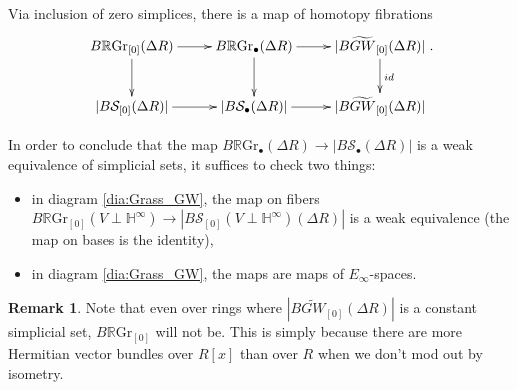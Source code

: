 \documentclass[edeposit,fullpage]{uiucthesis2009}
\newcommand{\mbb}{\mathbb}
\newcommand{\mc}{\mathcal}
\newcommand{\RGr}{\mathbb R\mathrm{Gr}}
\theoremstyle{plain}
\numberwithin{lemma}{section}
\theoremstyle{definition}
\newtheorem{remark}[lemma]{Remark}
\begin{document}
Via inclusion of zero simplices, there is a map of homotopy fibrations
\begin{equation}\label{dia:Grass_GW}
\begin{gathered}
\xymatrix{B\RGr_{[0]}(\Delta R) \ar[r]\ar[d] & B\RGr_\bullet(\Delta R) \ar[d] \ar[r] &
  |B\widetilde{GW}_{[0]}(\Delta R)| \ar[d]^{id} \\
|B\mc S_{[0]}(\Delta R)| \ar[r]& |B\mc S_\bullet(\Delta R)| \ar[r] &
  |B\widetilde{GW}_{[0]}(\Delta R)|}. 
\end{gathered}
\end{equation}

In order to conclude that the map $B\RGr_\bullet(\Delta R) \rightarrow
|B \mc S_\bullet (\Delta R)|$ is a weak equivalence of simplicial
sets, it suffices to check two things:
\begin{itemize}
\item in diagram \ref{dia:Grass_GW}, the map on fibers $B\RGr_{[0]}(V
  \perp \mbb H^\infty) \rightarrow |B\mc S_{[0]}(V \perp \mbb
  H^\infty)(\Delta R)|$ is a weak
  equivalence (the map on bases is the identity),
\item in diagram \ref{dia:Grass_GW}, the maps are maps of
  $E_\infty$-spaces.
\end{itemize}

\begin{remark}
Note that even over rings where $|B\widetilde{GW}_{[0]}(\Delta R)|$ is
a constant simplicial set, $B\RGr_{[0]}$ will
not be. This is simply because there are more Hermitian vector bundles over
$R[x]$ than over $R$ when we don't mod out by isometry. 

\end{remark}
\end{document}
